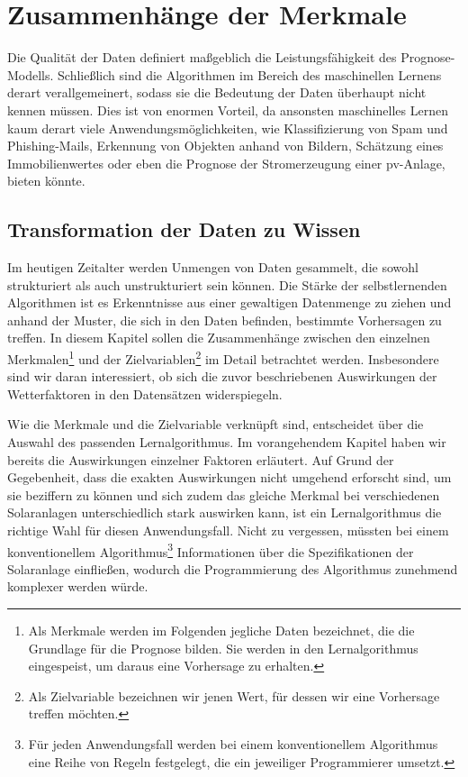 \documentclass[12pt, a4paper]{article}
\begin{document}
\newpage

\section{Zusammenhänge der Merkmale}
\label{sec:features}

Die Qualität der Daten definiert maßgeblich die Leistungsfähigkeit des Prognose-Modells. Schließlich sind die Algorithmen im Bereich des maschinellen Lernens derart verallgemeinert, sodass sie die Bedeutung der Daten überhaupt nicht kennen müssen. Dies ist von enormen Vorteil, da ansonsten maschinelles Lernen kaum derart viele Anwendungsmöglichkeiten, wie Klassifizierung von Spam und Phishing-Mails, Erkennung von Objekten anhand von Bildern, Schätzung eines Immobilienwertes oder eben die Prognose der Stromerzeugung einer \ac{pv}-Anlage, bieten könnte.

\subsection{Transformation der Daten zu Wissen}

Im heutigen Zeitalter werden Unmengen von Daten gesammelt, die sowohl strukturiert als auch unstrukturiert sein können. Die Stärke der selbstlernenden Algorithmen ist es Erkenntnisse aus einer gewaltigen Datenmenge zu ziehen und anhand der Muster, die sich in den Daten befinden, bestimmte Vorhersagen zu treffen. In diesem Kapitel sollen die Zusammenhänge zwischen den einzelnen Merkmalen\footnote{Als Merkmale werden im Folgenden jegliche Daten bezeichnet, die die Grundlage für die Prognose bilden. Sie werden in den Lernalgorithmus eingespeist, um daraus eine Vorhersage zu erhalten.} und der Zielvariablen\footnote{Als Zielvariable bezeichnen wir jenen Wert, für dessen wir eine Vorhersage treffen möchten.} im Detail betrachtet werden. Insbesondere sind wir daran interessiert, ob sich die zuvor beschriebenen Auswirkungen der Wetterfaktoren in den Datensätzen widerspiegeln.

Wie die Merkmale und die Zielvariable verknüpft sind, entscheidet über die Auswahl des passenden Lernalgorithmus. Im vorangehendem Kapitel haben wir bereits die Auswirkungen einzelner Faktoren erläutert. Auf Grund der Gegebenheit, dass die exakten Auswirkungen nicht umgehend erforscht sind, um sie beziffern zu können und sich zudem das gleiche Merkmal bei verschiedenen Solaranlagen unterschiedlich stark auswirken kann, ist ein Lernalgorithmus die richtige Wahl für diesen Anwendungsfall. Nicht zu vergessen, müssten bei einem konventionellem Algorithmus\footnote{Für jeden Anwendungsfall werden bei einem konventionellem Algorithmus eine Reihe von Regeln festgelegt, die ein jeweiliger Programmierer umsetzt.} Informationen über die Spezifikationen der Solaranlage einfließen, wodurch die Programmierung des Algorithmus zunehmend komplexer werden würde.
\end{document}
